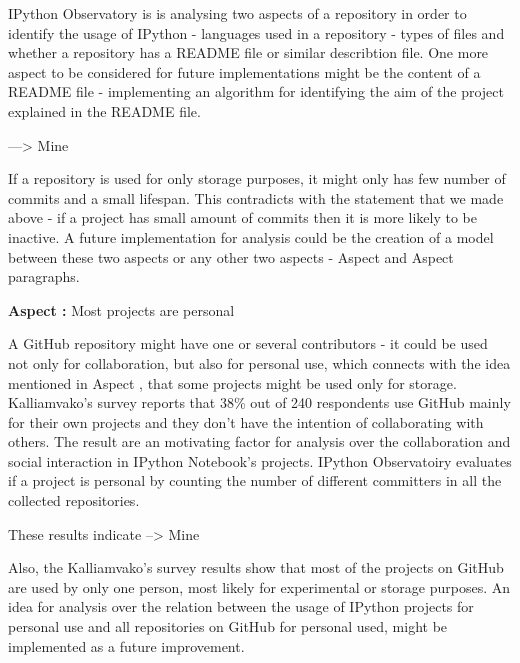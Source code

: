 IPython Observatory is is analysing two aspects of a repository in order to identify the usage of IPython - languages used in a repository - types of files and whether a repository has a README file or similar describtion file. One more aspect to be considered for future implementations might be the content of a README file - implementing an algorithm for identifying the aim of the project explained in the README file. 

---> Mine

If a repository is used for only storage purposes, it might only has few number of commits and a small lifespan. This contradicts with the statement that we made above - if a project has small amount of commits then it is more likely to be inactive. A future implementation for analysis could be the creation of a model between these two aspects or any other two aspects - Aspect  and Aspect  paragraphs.


\vspace{5mm}
\begin{mdframed}
\vspace{1px}
\textbf{Aspect :}  Most projects are personal
\vspace{1px}
\end{mdframed}
\vspace{2mm}

A GitHub repository might have one or several contributors - it could be used not only for collaboration, but also for personal use, which connects with the idea mentioned in Aspect , that some projects might be used only for storage. Kalliamvako's survey\cite{kalliamvakoupromises} reports that 38\% out of 240 respondents use GitHub mainly for their own projects and they don't have the intention of collaborating with others. The result are an motivating factor for analysis over the collaboration and social interaction in IPython Notebook's projects. IPython Observatoiry evaluates if a project is
personal by counting the number of different committers in all the collected repositories.

These results indicate --> Mine

Also, the Kalliamvako's survey\cite{kalliamvakoupromises} results show that most of the projects on GitHub are used by only one person, most likely for experimental or storage purposes. An idea for analysis over the relation between the usage of IPython projects for personal use and all repositories on GitHub for personal used, might be implemented as a future improvement.


